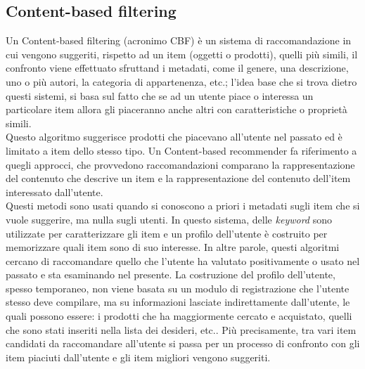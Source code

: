 \subsection{Content-based filtering}
Un Content-based filtering (acronimo CBF) è un sistema di raccomandazione in cui vengono suggeriti, rispetto ad un item (oggetti o prodotti), quelli 
più simili, il confronto viene effettuato sfruttand i metadati, come il genere, una descrizione, uno o più autori, la categoria di 
appartenenza, etc.; l'idea base che si trova dietro questi sistemi, si basa sul fatto che se ad un utente piace o interessa un particolare 
item allora gli piaceranno anche altri con caratteristiche o proprietà simili.\\
Questo algoritmo suggerisce prodotti che piacevano all'utente nel passato ed è limitato a item dello stesso tipo. Un 
Content-based recommender fa riferimento a quegli approcci, che provvedono raccomandazioni comparano la rappresentazione del
contenuto che descrive un item e la rappresentazione del contenuto dell'item interessato dall'utente.\\
Questi metodi sono usati quando si conoscono a priori i metadati sugli item che si vuole suggerire, ma nulla sugli utenti.
In questo sistema, delle \textit{keyword} sono utilizzate per caratterizzare gli item e un profilo dell'utente è 
costruito per memorizzare quali item sono di suo interesse. In altre parole, questi algoritmi cercano di raccomandare quello che 
l'utente ha valutato positivamente o usato nel passato e sta esaminando nel presente. La costruzione del profilo dell'utente,
spesso temporaneo, non viene basata su un modulo di registrazione che l'utente stesso deve compilare, ma su informazioni
lasciate indirettamente dall'utente, le quali possono essere: i prodotti che ha maggiormente cercato e acquistato, quelli che sono 
stati inseriti nella lista dei desideri, etc.. Più precisamente, tra vari item candidati da raccomandare all'utente si passa per un 
processo di confronto con gli item piaciuti dall'utente e gli item migliori vengono suggeriti.


